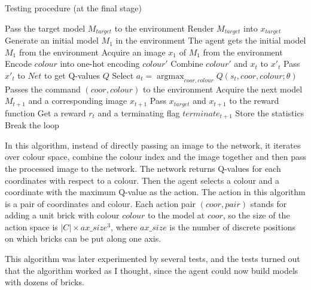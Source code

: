 \documentclass[a4paper]{article}
\DeclareMathOperator{\argmax}{argmax}
\begin{document}
        		\begin{algorithm}[]
        			\caption{Testing procedure (at the final stage)} \label{alg:test2}
        			\begin{algorithmic}[1]
        				\State Pass the target model $M_{target}$ to the environment
        				\State Render $M_{target}$ into $x_{target}$
        				\State Generate an initial model $M_1$ in the environment
        				\State The agent gets the initial model $M_1$ from the environment
        				\State Acquire an image $x_1$ of $M_1$ from the environment
		        				\State Encode $colour$ into one-hot encoding $colour'$ 
		        				\State Combine $colour'$ and $x_t$ to $x'_t$
		        				\State Pass $x'_t$ to $Net$ to get Q-values $Q$
	        				\EndFor
	        				\State Select $a_t = \argmax_{coor,colour} Q(s_t, coor, colour;\theta)$
	        				\State Passes the command $(coor, colour)$ to the environment
	        				\State Acquire the next model $M_{t+1}$ and a corresponding image $x_{t+1}$
	        				\State Pass $x_{target}$ and $x_{t+1}$ to the reward function
	        				\State Get a reward $r_t$ and a terminating flag $terminate_{t+1}$
	        				\State Store the statistics
	        					\State Break the loop 
	        				\EndIf
	        				
        				\EndFor
        				\EndProcedure
        			\end{algorithmic}
        		\end{algorithm}
        	
        	
        		In this algorithm, instead of directly passing an image to the network, it iterates over colour space, combine the colour index and the image together and then pass the processed image to the network. The network returns Q-values for each coordinates with respect to a colour. Then the agent selects a colour and a coordinate with the maximum Q-value as the action. The action in this algorithm is a pair of coordinates and colour. Each action pair $(coor, pair)$ stands for adding a unit brick with colour $colour$ to the model at $coor$, so the size of the action space is $|C|\times {ax\_size^3}$, where $ax\_size$ is the number of discrete positions on which bricks can be put along one axis. 
        		
        		This algorithm was later experimented by several tests, and the tests turned out that the algorithm worked as I thought, since the agent could now build models with dozens of bricks. 
        		
\end{document}
